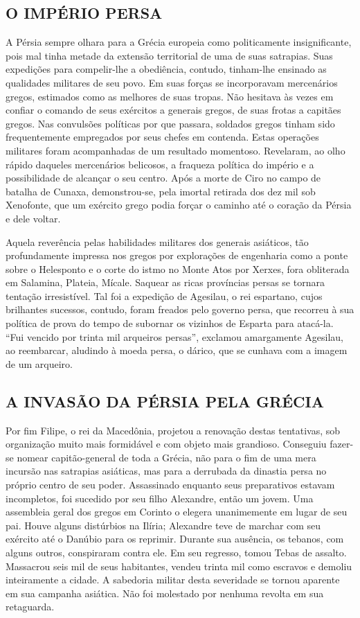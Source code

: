 \documentclass[11pt,a5paper,twoside,openany]{book}
\begin{document}
\subsection*{O IMPÉRIO PERSA}
A Pérsia sempre olhara para a Grécia europeia como politicamente insignificante, pois mal tinha metade da extensão territorial de uma de suas satrapias. Suas expedições para compelir-lhe a obediência, contudo, tinham-lhe ensinado as qualidades militares de seu povo. Em suas forças se incorporavam mercenários gregos, estimados como as melhores de suas tropas. Não hesitava às vezes em confiar o comando de seus exércitos a generais gregos, de suas frotas a capitães gregos. Nas convulsões políticas por que passara, soldados gregos tinham sido frequentemente empregados por seus chefes em contenda. Estas operações militares foram acompanhadas de um resultado momentoso. Revelaram, ao olho rápido daqueles mercenários belicosos, a fraqueza política do império e a possibilidade de alcançar o seu centro. Após a morte de Ciro no campo de batalha de Cunaxa, demonstrou-se, pela imortal retirada dos dez mil sob Xenofonte, que um exército grego podia forçar o caminho até o coração da Pérsia e dele voltar.

Aquela reverência pelas habilidades militares dos generais asiáticos, tão profundamente impressa nos gregos por explorações de engenharia como a ponte sobre o Helesponto e o corte do istmo no Monte Atos por Xerxes, fora obliterada em Salamina, Plateia, Mícale. Saquear as ricas províncias persas se tornara tentação irresistível. Tal foi a expedição de Agesilau, o rei espartano, cujos brilhantes sucessos, contudo, foram freados pelo governo persa, que recorreu à sua política de prova do tempo de subornar os vizinhos de Esparta para atacá-la. “Fui vencido por trinta mil arqueiros persas”, exclamou amargamente Agesilau, ao reembarcar, aludindo à moeda persa, o dárico, que se cunhava com a imagem de um arqueiro.

\subsection*{A INVASÃO DA PÉRSIA PELA GRÉCIA}
Por fim Filipe, o rei da Macedônia, projetou a renovação destas tentativas, sob organização muito mais formidável e com objeto mais grandioso. Conseguiu fazer-se nomear capitão-general de toda a Grécia, não para o fim de uma mera incursão nas satrapias asiáticas, mas para a derrubada da dinastia persa no próprio centro de seu poder. Assassinado enquanto seus preparativos estavam incompletos, foi sucedido por seu filho Alexandre, então um jovem. Uma assembleia geral dos gregos em Corinto o elegera unanimemente em lugar de seu pai. Houve alguns distúrbios na Ilíria; Alexandre teve de marchar com seu exército até o Danúbio para os reprimir. Durante sua ausência, os tebanos, com alguns outros, conspiraram contra ele. Em seu regresso, tomou Tebas de assalto. Massacrou seis mil de seus habitantes, vendeu trinta mil como escravos e demoliu inteiramente a cidade. A sabedoria militar desta severidade se tornou aparente em sua campanha asiática. Não foi molestado por nenhuma revolta em sua retaguarda.
\end{document}
